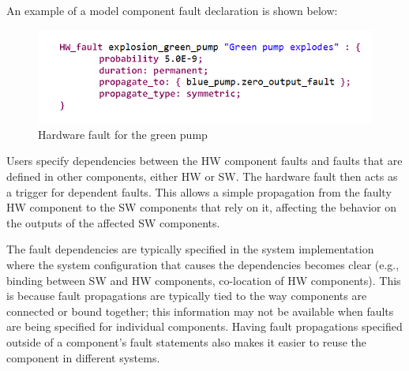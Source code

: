 An example of a model component fault declaration is shown below:
\begin{figure}[h!]
	\vspace{-0.2in}
	\begin{center}
		\includegraphics[width=.5\textwidth]{images/hw_fault_green_pump.png}
	\end{center}
	\vspace{-0.3in}
	\caption{Hardware fault for the green pump}
	\label{fig:hwFault}
	\vspace{-0.2in}
\end{figure}

Users specify dependencies between the HW component faults and faults that are defined in other components, either HW or SW. The hardware fault then acts as a trigger for dependent faults. This allows a simple propagation from the faulty HW component to the SW components that rely on it, affecting the behavior on the outputs of the affected SW components.


The fault dependencies are typically specified in the system implementation where the system configuration that causes the dependencies becomes clear (e.g., binding between SW and HW components, co-location of HW components). This is because fault propagations are typically tied to the way components are connected or bound together; this information may not be available when faults are being specified for individual components. Having fault propagations specified outside of a component’s fault statements also makes it easier to reuse the component in different systems. 

